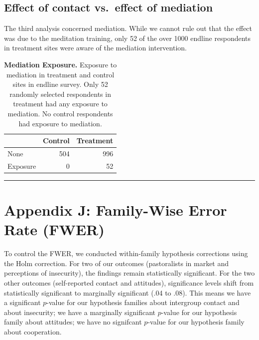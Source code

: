 \documentclass[
]{article}
\begin{document}
\hypertarget{effect-of-contact-vs.-effect-of-mediation}{%
\subsection{Effect of contact vs.~effect of
mediation}\label{effect-of-contact-vs.-effect-of-mediation}}

The third analysis concerned mediation. While we cannot rule out that
the effect was due to the meditation training, only 52 of the over 1000
endline respondents in treatment sites were aware of the mediation
intervention.

\begin{table}[H]
\begin{center}
\label{tab:mediat_tab}
\caption{\textbf{Mediation Exposure.} Exposure to mediation in treatment and control sites in endline survey. Only 52 randomly selected respondents in treatment had any exposure to mediation. No control respondents had exposure to mediation.}
\smallskip

\begin{tabular}{l|r|r}
\hline
  & Control & Treatment\\
\hline
None & 504 & 996\\
\hline
Exposure & 0 & 52\\
\hline
\end{tabular}


\end{center}
\end{table}

\begin{center}\rule{0.5\linewidth}{0.5pt}\end{center}

\newpage

\hypertarget{appendix-j-family-wise-error-rate-fwer}{%
\section{Appendix J: Family-Wise Error Rate
(FWER)}\label{appendix-j-family-wise-error-rate-fwer}}

To control the FWER, we conducted within-family hypothesis corrections
using the Holm correction. For two of our outcomes (pastoralists in
market and perceptions of insecurity), the findings remain statistically
significant. For the two other outcomes (self-reported contact and
attitudes), significance levels shift from statistically significant to
marginally significant (.04 to .08). This means we have a significant
\(p\)-value for our hypothesis families about intergroup contact and
about insecurity; we have a marginally significant \(p\)-value for our
hypothesis family about attitudes; we have no signifcant \(p\)-value for
our hypothesis family about cooperation.
\end{document}
